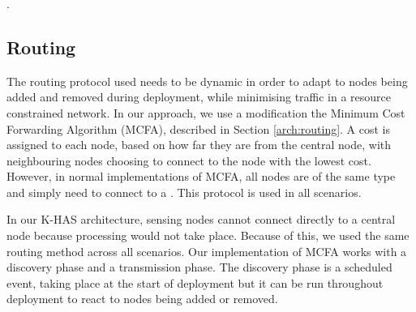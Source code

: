 	\subsubsection{}

	\textit{} \textit{} \DIFaddend \textit{\DIFdelbegin {}\DIFdelend \DIFaddbegin {}\DIFaddend } \DIFdelbegin {}\textit{} %
\DIFdelend \DIFaddbegin {}\textit{} \DIFaddend .

\subsection{Routing \DIFaddbegin {}\DIFaddend }
The routing protocol used needs to be dynamic in order to adapt to nodes being added and removed during deployment, while minimising traffic in a resource constrained network. In our approach, we use a modification \DIFaddbegin {}\DIFaddend the Minimum Cost Forwarding Algorithm (MCFA), described in Section \ref{arch:routing}. A cost is assigned to each node, based on how far they are from the central node, with neighbouring nodes choosing to connect to the node with the lowest cost. However, in normal implementations of MCFA, all nodes are of the same type and simply need to connect to a \DIFdelbegin {}\DIFdelend \DIFaddbegin {}\DIFaddend . This protocol is used in all scenarios.

In our K-HAS architecture, sensing nodes cannot connect directly to a central node because processing would not take place. Because of this, we used the same routing method across all scenarios. Our implementation of MCFA works with a discovery phase and a transmission phase. The discovery phase is a scheduled event, taking place at the start of deployment but it can be run throughout deployment to react to nodes being added or removed. 

